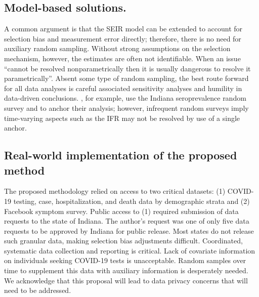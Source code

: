 \documentclass[11pt]{amsart}
\numberwithin{equation}{section}
\theoremstyle{plain}
\begin{document}

 \subsection*{Model-based solutions.}

 A common argument is that the SEIR model can be extended to account for selection bias and measurement error directly; therefore, there is no need for auxiliary random sampling.  Without strong assumptions on the selection mechanism, however, the estimates are often not identifiable.  When an issue ``cannot be resolved nonparametrically then it is usually dangerous to resolve it parametrically''\citep{CoxHink74}. Absent some type of random sampling, the best route forward for all data analyses is careful associated sensitivity analyses and humility in data-driven conclusions.  \cite{Ironse2103272118}, for example, use the Indiana seroprevalence random survey and to anchor their analysis; however, infrequent random surveys imply time-varying aspects such as the IFR may not be resolved by use of a single anchor.


 \subsection*{Real-world implementation of the proposed method}

 The proposed methodology relied on access to two critical datasets: (1) COVID-19 testing, case, hospitalization, and death data by demographic strata and (2) Facebook symptom survey.  Public access to (1) required submission of data requests to the state of Indiana.  The author's request was one of only five data requests to be approved by Indiana for public release.  Most states do not release such granular data, making selection bias adjustments difficult.  Coordinated, systematic data collection and reporting is critical.
 Lack of covariate information on individuals seeking COVID-19 tests is unacceptable.  Random samples over time to supplement this data with auxiliary information is desperately needed.  We acknowledge that this proposal will lead to data privacy concerns that will need to be addressed.
\end{document}
